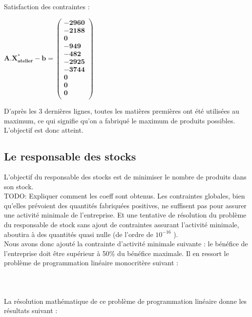 \documentclass[12pt]{article}
\begin{document}
Satisfaction des contraintes : 
\begin{center}
$\mathbf{A.X^{*}_{atelier} - b = 
   \left (
   \begin{array}{c}
      -2960 \\
      -2188 \\
      0 \\
      -949 \\
      -482\\
      -2925 \\
      -3744 \\
      0 \\
      0 \\
      0\\
   \end{array}
   \right )
 } $ 
\end{center}
D’après les 3 dernières lignes, toutes les matières premières ont été utilisées au maximum, ce 
qui signifie qu’on a fabriqué le maximum de produits possibles. L'objectif est donc atteint.

\subsection{Le responsable des stocks}
L'objectif du responsable des stocks est de minimiser le nombre de produits dans son stock. \\
TODO: Expliquer comment les coeff sont obtenus.
Les contraintes globales, bien qu'elles prévoient des quantités fabriquées positives, ne suffisent pas pour assurer une activité minimale de l'entreprise. Et une tentative de résolution du problème du responsable de stock sans ajout de contraintes assurant l'activité minimale, aboutira à des quantités quasi nulle (de l'ordre de $ 10 ^{-16}$ ).\\
Nous avons donc ajouté la contrainte d'activité minimale suivante : le bénéfice de l'entreprise doit être supérieur à 50\% du bénéfice maximale. 
Il en ressort le problème de programmation linéaire monocritère suivant :\\
\\
\noindent{}
\\
\\
La résolution mathématique de ce problème de programmation linéaire donne les résultats suivant :\\
\end{document}
